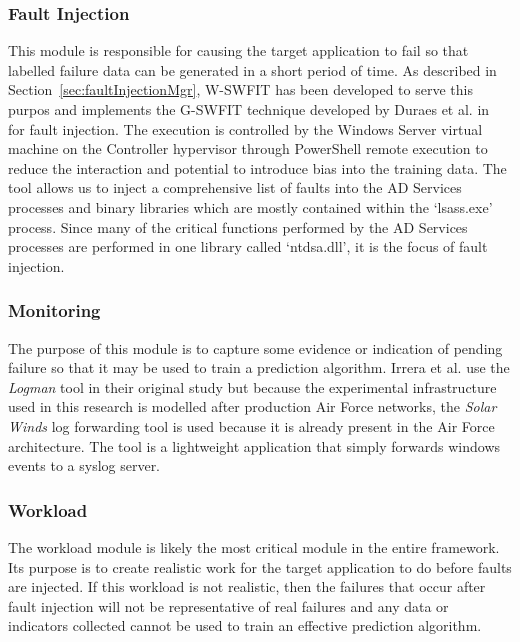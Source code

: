 \subsubsection{Fault Injection} \label{sec:faultInjectionTool} 
This module is responsible for causing the target application to fail so that
labelled failure data can be generated in a short period of time.  As described
in Section~\ref{sec:faultInjectionMgr}, W-SWFIT has been developed to serve
this purpos and implements the G-SWFIT technique developed by Duraes et al.
in~\cite{gswfit} for fault injection.  The execution is controlled by the
Windows Server virtual machine on the Controller hypervisor through PowerShell
remote execution to reduce the interaction and potential to introduce bias into
the training data.  The tool allows us to inject a comprehensive list of faults
into the AD Services processes and binary libraries which are mostly contained
within the `lsass.exe' process.  Since many of the critical functions performed
by the AD Services processes are performed in one library called `ntdsa.dll',
it is the focus of fault injection.

\subsubsection{Monitoring} \label{sec:sandboxMonitoringTool} 
The purpose of this module is to capture some evidence or indication of pending
failure so that it may be used to train a prediction algorithm.  Irrera et al.
use the \emph{Logman} tool in their original study but because the experimental
infrastructure used in this research is modelled after production Air Force
networks, the \emph{Solar Winds} log forwarding tool is used because it is
already present in the Air Force architecture.  The tool is a lightweight
application that simply forwards windows events to a syslog server.

\subsubsection{Workload}  \label{sec:sandboxWorkload} 
The workload module is likely the most critical module in the entire framework.
Its purpose is to create realistic work for the target application to do before
faults are injected.  If this workload is not realistic, then the failures that
occur after fault injection will not be representative of real failures and any
data or indicators collected cannot be used to train an effective prediction
algorithm.

